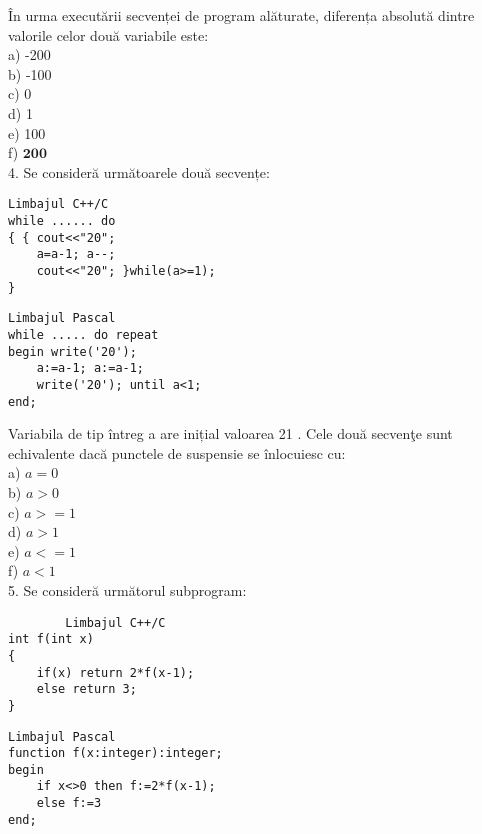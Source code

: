 În urma executării secvenței de program alăturate, diferența absolută dintre valorile celor două variabile este:\\
a) -200\\
b) -100\\
c) 0\\
d) 1\\
e) 100\\
f) $\mathbf{2 0 0}$\\
4. Se consideră următoarele două secvențe:

\begin{verbatim}
Limbajul C++/C
while ...... do
{ { cout<<"20";
    a=a-1; a--;
    cout<<"20"; }while(a>=1);
}
\end{verbatim}

\begin{verbatim}
Limbajul Pascal
while ..... do repeat
begin write('20');
    a:=a-1; a:=a-1;
    write('20'); until a<1;
end;
\end{verbatim}

Variabila de tip întreg a are inițial valoarea 21 . Cele două secvenţe sunt echivalente dacă punctele de suspensie se înlocuiesc cu:\\
a) $a=0$\\
b) $a>0$\\
c) $a>=1$\\
d) $a>1$\\
e) $a<=1$\\
f) $a<1$\\
5. Se consideră următorul subprogram:

\begin{verbatim}
        Limbajul C++/C
int f(int x)
{
    if(x) return 2*f(x-1);
    else return 3;
}
\end{verbatim}

\begin{verbatim}
Limbajul Pascal
function f(x:integer):integer;
begin
    if x<>0 then f:=2*f(x-1);
    else f:=3
end;
\end{verbatim}

